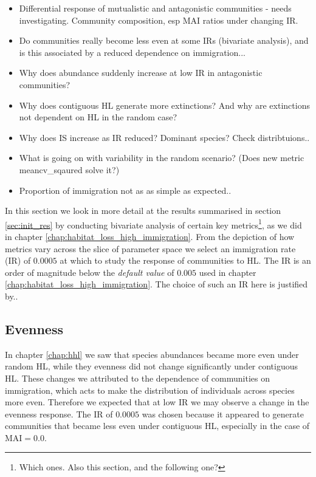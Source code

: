 \begin{itemize}
	\item Differential response of mutualistic and antagonistic communities - needs investigating. Community composition, esp MAI ratios under changing IR.
	\item Do communities really become less even at some IRs (bivariate analysis), and is this associated by a reduced dependence on immigration...
	\item Why does abundance suddenly increase at low IR in antagonistic communities?
	\item Why does contiguous HL generate more extinctions? And why are extinctions not dependent on HL in the random case?
	\item Why does IS increase as IR reduced? Dominant species? Check distribtuions..
	\item What is going on with variability in the random scenario? (Does new metric meancv\_sqaured solve it?)
	
	\item Proportion of immigration not as as simple as expected..
\end{itemize}

In this section we look in more detail at the results summarised in section \ref{sec:init_res} by conducting bivariate analysis of certain key metrics\footnote{Which ones. Also this section, and the following one?}, as we did in chapter \ref{chap:habitat_loss_high_immigration}. From the depiction of how metrics vary across the slice of parameter space we select an immigration rate (IR) of $0.0005$ at which to study the response of communities to HL. The IR is an order of magnitude below the \emph{default value} of $0.005$ used in chapter \ref{chap:habitat_loss_high_immigration}. The choice of such an IR here is justified by..

\subsection{Evenness}
\label{sec:biv_HL_evenness}

In chapter \ref{chap:hhl} we saw that species abundances became more even under random HL, while they evenness did not change significantly under contiguous HL. These changes we attributed to the dependence of communities on immigration, which acts to make the distribution of individuals across species more even. Therefore we expected that at low IR we may observe a change in the evenness response. The IR of $0.0005$ was chosen because it appeared to generate communities that became less even under contiguous HL, especially in the case of MAI$=0.0$.

